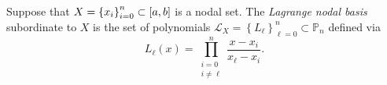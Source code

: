 \begin{frame}

    \begin{definition}
        Suppose that
        \begin{math}
            X={\left\{x_{i}\right\}}_{i=0}^{n}\subset
            \left[a,b\right]
        \end{math}
        is a nodal set.
        The \emph{Lagrange nodal basis} subordinate to $X$ is the set
        of polynomials
        \begin{math}
            \mathcal{L}_{X}=
            {\left\{
            L_{\ell}
            \right\}}_{\ell=0}^{n}\subset
            \mathbb{P}_{n}
        \end{math}
        defined via
        \begin{equation*}
            L_{\ell}
            \left(x\right)=
            \prod\limits_{\substack{i=0\\i\neq\ell}}^{n}
            \dfrac{x-x_{i}}{x_{\ell}-x_{i}}.
        \end{equation*}
    \end{definition}



\end{frame}
